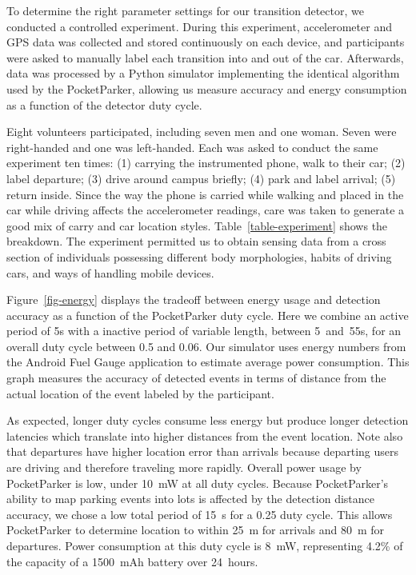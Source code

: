 \documentclass{sigchi}
\begin{document}
To determine the right parameter settings for our transition detector, we
conducted a controlled experiment. During this experiment, accelerometer and
GPS data was collected and stored continuously on each device, and
participants were asked to manually label each transition into and out of the
car. Afterwards, data was processed by a Python simulator implementing the
identical algorithm used by the PocketParker, allowing us measure
accuracy and energy consumption as a function of the detector duty cycle.

Eight volunteers participated, including seven men and one woman. Seven were
right-handed and one was left-handed. Each was asked to conduct the same
experiment ten times: (1) carrying the instrumented phone, walk to their car;
(2) label departure; (3) drive around campus briefly; (4) park and label
arrival; (5) return inside. Since the way the phone is carried while walking
and placed in the car while driving affects the accelerometer readings, care
was taken to generate a good mix of carry and car location styles.
Table~\ref{table-experiment} shows the breakdown. The experiment permitted us
to obtain sensing data from a cross section of individuals possessing
different body morphologies, habits of driving cars, and ways of handling
mobile devices.

Figure~\ref{fig-energy} displays the tradeoff between energy usage and
detection accuracy as a function of the PocketParker duty cycle. Here we
combine an active period of 5s with a inactive period of variable length,
between 5~and~55s, for an overall duty cycle between 0.5 and 0.06. Our
simulator uses energy numbers from the Android Fuel Gauge application
to estimate average power consumption.  This graph measures the accuracy of
detected events in terms of distance from the actual location of the event
labeled by the participant.

As expected, longer duty cycles consume less energy but produce longer
detection latencies which translate into higher distances from the event
location. Note also that departures have higher location error than arrivals
because departing users are driving and therefore traveling more rapidly.
Overall power usage by PocketParker is low, under 10~mW at all duty cycles.
Because PocketParker's ability to map parking events into lots is affected by
the detection distance accuracy, we chose a low total period of 15~s for a
0.25 duty cycle. This allows PocketParker to determine location to within
25~m for arrivals and 80~m for departures. Power consumption at this duty
cycle is 8~mW, representing 4.2\% of the capacity of a 1500~mAh battery over
24~hours.
\end{document}
